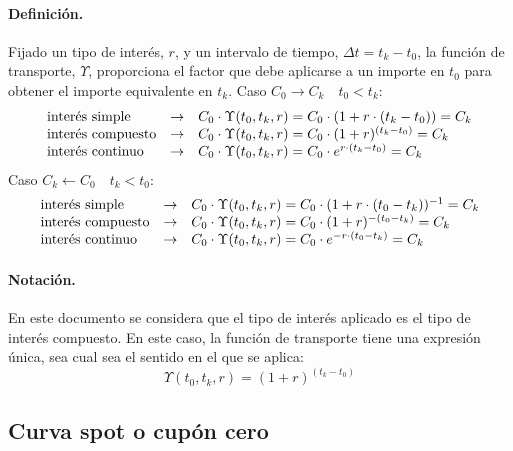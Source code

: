 \paragraph{Definici\'on.} Fijado un tipo de inter\'es, $r$, y un intervalo de
tiempo, $\Delta t = t_k-t_0$, la funci\'on de transporte, $\Upsilon$, proporciona 
el factor que debe aplicarse a un importe en $t_0$ para obtener el importe 
equivalente en $t_k$.
\newline
\newline
Caso $C_0 \longrightarrow C_k \quad t_0 < t_k$:
\begin{displaymath}
\begin{array}{lcl}
\textrm{inter\'es simple}    & \rightarrow & C_0 \cdot \Upsilon(t_0,t_k, r) = C_0 \cdot (1+r\cdot(t_k-t_0)) = C_k \cr
\textrm{inter\'es compuesto} & \rightarrow & C_0 \cdot \Upsilon(t_0,t_k, r) = C_0 \cdot (1+r)^{(t_k-t_0)} = C_k \cr
\textrm{inter\'es continuo}  & \rightarrow & C_0 \cdot \Upsilon(t_0,t_k, r) = C_0 \cdot e^{r\cdot(t_k-t_0)} = C_k 
\end{array}
\end{displaymath}
Caso $C_k \longleftarrow C_0 \quad t_k < t_0$:
\begin{displaymath}
\begin{array}{lcl}
\textrm{inter\'es simple}    & \rightarrow & C_0 \cdot \Upsilon(t_0,t_k, r) = C_0 \cdot (1+r\cdot(t_0-t_k))^{-1} = C_k \cr
\textrm{inter\'es compuesto} & \rightarrow & C_0 \cdot \Upsilon(t_0,t_k, r) = C_0 \cdot (1+r)^{-(t_0-t_k)} = C_k \cr
\textrm{inter\'es continuo}  & \rightarrow & C_0 \cdot \Upsilon(t_0,t_k, r) = C_0 \cdot e^{-r\cdot(t_0-t_k)} = C_k
\end{array}
\end{displaymath}

\paragraph{Notaci\'on.} En este documento se considera que el tipo de inter\'es
aplicado es el tipo de inter\'es compuesto. En este caso, la funci\'on de transporte
tiene una expresi\'on \'unica, sea cual sea el sentido en el que se aplica:
\begin{displaymath}
\Upsilon(t_0,t_k, r) = (1+r)^{(t_k-t_0)}
\end{displaymath}


\subsection{Curva spot o cup\'on cero}

